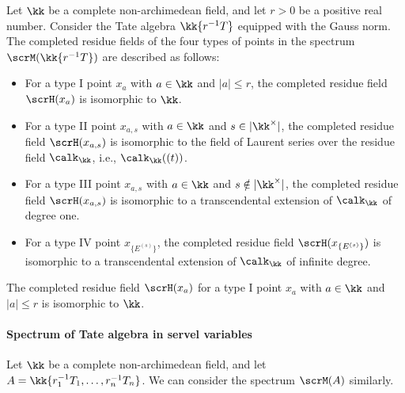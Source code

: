     \begin{proposition}\label{prop:the_complete_residue_field_of_all_four_types_points_in__spectrum_of_Tate_algebra_in_one_variable}
        Let \(\kk\) be a complete non-archimedean field, and let \(r > 0\) be a positive real number.
        Consider the Tate algebra \(\kk\{r^{-1}T\}\) equipped with the Gauss norm.
        The completed residue fields of the four types of points in the spectrum \(\scrM(\kk\{r^{-1}T\})\) are described as follows:
        \begin{itemize}
            \item For a type I point \(x_a\) with \(a \in \kk\) and \(|a| \leq r\), the completed residue field \(\scrH(x_a)\) is isomorphic to \(\kk\).
            \item For a type II point \(x_{a,s}\) with \(a \in \kk\) and \(s \in |\kk^\times|\), the completed residue field \(\scrH(x_{a,s})\) is isomorphic to the field of Laurent series over the residue field \(\calk_\kk\), i.e., \(\calk_\kk((t))\).
            \item For a type III point \(x_{a,s}\) with \(a \in \kk\) and \(s \notin |\kk^\times|\), the completed residue field \(\scrH(x_{a,s})\) is isomorphic to a transcendental extension of \(\calk_\kk\) of degree one.
            \item For a type IV point \(x_{\{E^{(s)}\}}\), the completed residue field \(\scrH(x_{\{E^{(s)}\}})\) is isomorphic to a transcendental extension of \(\calk_\kk\) of infinite degree.
        \end{itemize}
    \end{proposition}

    \begin{example}\label{eg:completed_residue_field_in_spectrum_of_Tate_algebra_in_one_variable_over_Q_p}
        The completed residue field \(\scrH(x_a)\) for a type I point \(x_a\) with \(a \in \kk\) and \(|a| \leq r\) is isomorphic to \(\kk\).
    \end{example}

    \paragraph{Spectrum of Tate algebra in servel variables} Let \(\kk\) be a complete non-archimedean field, and let \(A = \kk\{r_1^{-1}T_1, \ldots, r_n^{-1}T_n\}\).
    We can consider the spectrum \(\scrM(A)\) similarly.